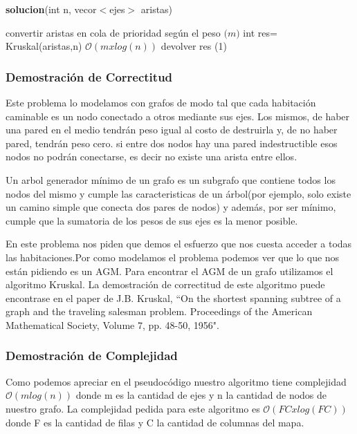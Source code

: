 \documentclass[spanish,12pt]{article}
\begin{document}
\begin{algorithm}[H]{\textbf{solucion}(int n, vecor$<$ejes$>$ aristas)}
	\begin{algorithmic}[1]
		\State \quad convertir aristas en cola de prioridad según el peso \Comment $\mathcal(m)$
		\State \quad int res= Kruskal(aristas,n)  \Comment $\mathcal{O}(mxlog(n))$
		\State \quad devolver res \Comment {}(1)
	\end{algorithmic}
\end{algorithm}

\subsubsection{Demostración de Correctitud}

Este problema lo modelamos con grafos de modo tal que cada habitación caminable es un nodo conectado a otros mediante sus ejes. Los mismos, de haber una pared en el medio tendrán peso igual al costo de destruirla y, de no haber pared, tendrán peso cero. si entre dos nodos hay una pared indestructible esos nodos no podrán conectarse, es decir no existe una arista entre ellos.

Un arbol generador mínimo de un grafo es un subgrafo que contiene todos los nodos del mismo y cumple las caracteristicas de un árbol(por ejemplo, solo existe un camino simple que conecta dos pares de nodos) y además, por ser mínimo, cumple que la sumatoria de los pesos de sus ejes es la menor posible.

En este problema nos piden que demos el esfuerzo que nos cuesta acceder a todas las habitaciones.Por como modelamos el problema podemos ver que lo que nos están pidiendo es un AGM. Para encontrar el AGM de un grafo utilizamos el algoritmo Kruskal. La demostración de correctitud de este algoritmo puede encontrase en el paper de  J.B. Kruskal, ``On the shortest spanning subtree of a graph and the traveling salesman problem. Proceedings of the American Mathematical Society, Volume 7, pp. 48-50, 1956".



\subsubsection{Demostración de Complejidad}


Como podemos apreciar en el pseudocódigo nuestro algoritmo tiene complejidad $\mathcal{O}(mlog(n))$ donde m es la cantidad de ejes y n la cantidad de nodos de nuestro grafo.
La complejidad pedida para este algoritmo es $\mathcal{O}(FCxlog(FC))$ donde F es la cantidad de filas y C la cantidad de columnas del mapa.
\end{document}
